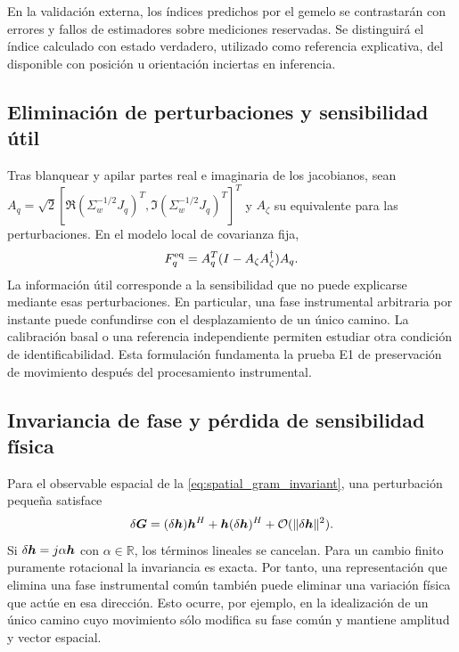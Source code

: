 En la validación externa, los índices predichos por el gemelo se contrastarán
con errores y fallos de estimadores sobre mediciones reservadas. Se distinguirá
el índice calculado con estado verdadero, utilizado como referencia explicativa,
del disponible con posición u orientación inciertas en inferencia.

\subsection{Eliminación de perturbaciones y sensibilidad útil}

Tras blanquear y apilar partes real e imaginaria de los jacobianos, sean
$A_q=\sqrt{2}[\Re(\Sigma_w^{-1/2}J_q)^T,
\Im(\Sigma_w^{-1/2}J_q)^T]^T$ y $A_\zeta$ su equivalente para las
perturbaciones. En el modelo local de covarianza fija,
\begin{equation}
F_q^{\rm eq}=A_q^T(I-A_\zeta A_\zeta^\dagger)A_q.
\end{equation}
La información útil corresponde a la sensibilidad que no puede explicarse
mediante esas perturbaciones. En particular, una fase instrumental arbitraria
por instante puede confundirse con el desplazamiento de un único camino.
La calibración basal o una referencia independiente permiten estudiar otra
condición de identificabilidad. Esta formulación fundamenta la prueba E1 de
preservación de movimiento después del procesamiento instrumental.


\subsection{Invariancia de fase y pérdida de sensibilidad física}
\label{sec:invariance_sensing_limit}

Para el observable espacial de la \cref{eq:spatial_gram_invariant}, una
perturbación pequeña satisface
\begin{equation}
\delta\bm{G}=(\delta\bm{h})\bm{h}^H+\bm{h}(\delta\bm{h})^H
+\mathcal O(\|\delta\bm{h}\|^2).
\end{equation}
Si $\delta\bm{h}=j\alpha\bm{h}$ con $\alpha\in\mathbb R$, los términos
lineales se cancelan. Para un cambio finito puramente rotacional la invariancia
es exacta. Por tanto, una representación que elimina una fase instrumental
común también puede eliminar una variación física que actúe en esa dirección.
Esto ocurre, por ejemplo, en la idealización de un único camino cuyo movimiento
sólo modifica su fase común y mantiene amplitud y vector espacial.

